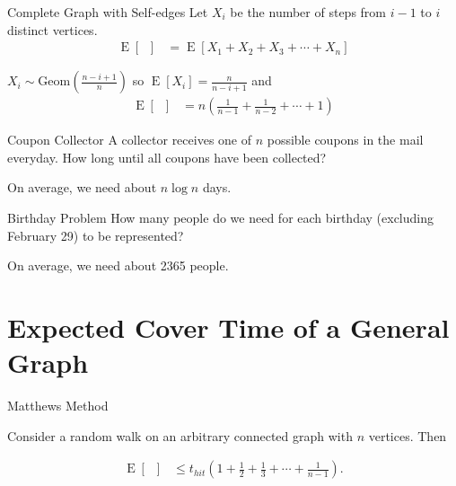 \documentclass[12pt]{beamer}
\DeclareMathOperator{\E}{\textrm{E}}		     %
\DeclareMathOperator{\cov}{t_{cov}}	             %
\begin{document}
\begin{frame}{Complete Graph with Self-edges}
Let $X_i$ be the number of steps from $i-1$ to $i$ distinct vertices.
 {
\begin{align}
\E[\cov] &= \E[X_1+X_2+X_3+\cdots+X_{n}] \nonumber
\end{align}
}

 {$X_i \sim \textrm{Geom}(\frac{n-i+1}{n})$}
 {so $\E[X_i] = \frac{n}{n-i+1}$}
 {and
\begin{align}
\E[\cov] &= n\left(\frac{1}{n-1}+\frac{1}{n-2}+\cdots+1\right) \nonumber
\end{align}
}
\end{frame}

\begin{frame}{Coupon Collector}
\centering
A collector receives one of $n$ possible coupons in the mail everyday.
How long until all coupons have been collected?
\bigskip

On average, we need about $n \log n$ days.
\end{frame}

\begin{frame}{Birthday Problem}
\centering
How many people do we need for each birthday (excluding February 29)
to be represented?
\bigskip

On average, we need about 2365 people.
\end{frame}

\section{Expected Cover Time of a General Graph}

\begin{frame}{Matthews Method}
\begin{theorem}
Consider a random walk on an arbitrary connected graph with $n$ vertices. Then
\end{theorem}
\begin{align}
\E[\cov] &\leq t_{hit} \left(1 + \frac{1}{2} + \frac{1}{3} + \cdots + \frac{1}{n-1} \right). \nonumber
\end{align}
\end{frame}
\end{document}
